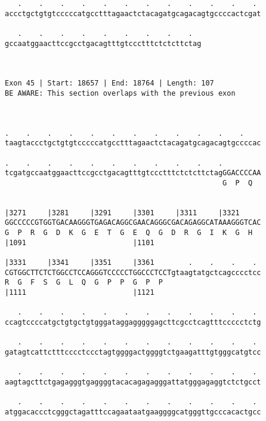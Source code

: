 \documentclass{article}
\begin{document}
\begin{Verbatim}
   .    .    .    .    .    .    .    .    .    .    .    . 
accctgctgtgtcccccatgcctttagaactctacagatgcagacagtgccccactcgat
                                                            
   .    .    .    .    .    .    .    .    .  
gccaatggaacttccgcctgacagtttgtccctttctctcttctag
                                              
                                              
 
Exon 45 | Start: 18657 | End: 18764 | Length: 107
BE AWARE: This section overlaps with the previous exon



.    .    .    .    .    .    .    .    .    .    .    .    
taagtaccctgctgtgtcccccatgcctttagaactctacagatgcagacagtgccccac
                                                            
.    .    .    .    .    .    .    .    .    .    .         
tcgatgccaatggaacttccgcctgacagtttgtccctttctctcttctagGGACCCCAA
                                                   G  P  Q  
                                                            
  
|3271     |3281     |3291     |3301     |3311     |3321     
GGCCCCCGTGGTGACAAGGGTGAGACAGGCGAACAGGGCGACAGAGGCATAAAGGGTCAC
G  P  R  G  D  K  G  E  T  G  E  Q  G  D  R  G  I  K  G  H  
|1091                         |1101                         
  
|3331     |3341     |3351     |3361        .    .    .    . 
CGTGGCTTCTCTGGCCTCCAGGGTCCCCCTGGCCCTCCTgtaagtatgctcagcccctcc
R  G  F  S  G  L  Q  G  P  P  G  P  P                       
|1111                         |1121                         
  
   .    .    .    .    .    .    .    .    .    .    .    . 
ccagtccccatgctgtgctgtgggataggagggggagcttcgcctcagtttccccctctg
                                                            
   .    .    .    .    .    .    .    .    .    .    .    . 
gatagtcattctttcccctccctagtggggactggggtctgaagatttgtgggcatgtcc
                                                            
   .    .    .    .    .    .    .    .    .    .    .    . 
aagtagcttctgagagggtgaggggtacacagagagggattatgggagaggtctctgcct
                                                            
   .    .    .    .    .    .    .    .    .    .    .    . 
atggacaccctcgggctagatttccagaataatgaaggggcatgggttgcccacactgcc
                                                            

\end{Verbatim}
\end{document}
